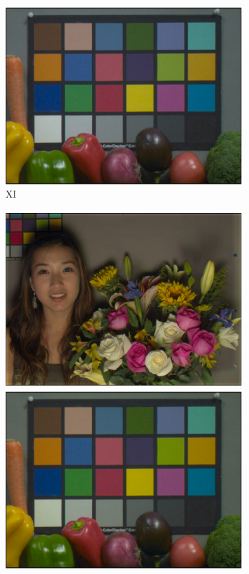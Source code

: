 \documentclass[]{spie}
\begin{document}
\begin{figure}
\begin{center}
\begin{subfigure}[b]{0.3\textwidth}
    \includegraphics[width=\textwidth]{VeggieFluXI}
    \caption{XI}
\end{subfigure}
\begin{subfigure}[b]{0.3\textwidth}
    \includegraphics[width=\textwidth]{FaceFluSI}
    \includegraphics[width=\textwidth]{VeggieFluSI}

\end{subfigure}
\end{center}
\end{figure}
\end{document}
